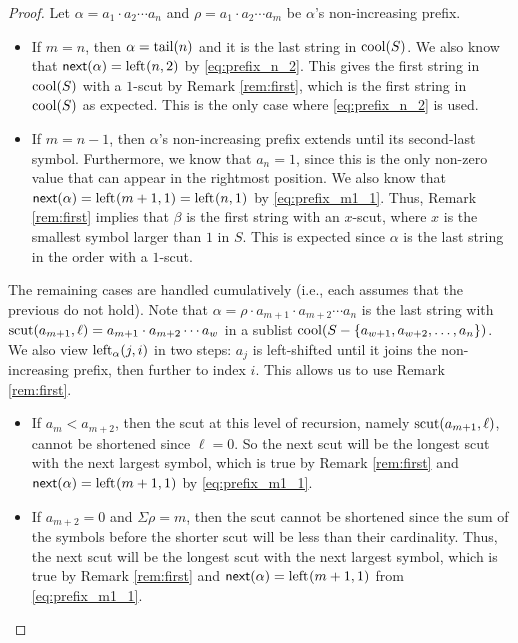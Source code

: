 \begin{proof}
Let $\alpha = a_1 \cdot a_2 \cdots a_n$ and $\rho = a_1 \cdot a_2 \cdots a_m$ be $\alpha$'s non-increasing prefix.

\begin{itemize}[nosep]
\item If $m=n$, then $\alpha = \tail(n)$ and it is the last string in $\cool{S}$.
We also know that $\nextPrefix{\alpha} = \lshiftindex{n}{2}$ by \eqref{eq:prefix_n_2}.
This gives the first string in $\cool{S}$ with a $1$-scut by Remark \ref{rem:first}, which is the first string in $\cool{S}$ as expected.
This is the only case where \eqref{eq:prefix_n_2} is used.
\item If $m=n-1$, then $\alpha$'s non-increasing prefix extends until its second-last symbol.
Furthermore, we know that $a_n = 1$, since this is the only non-zero value that can appear in the rightmost position.
We also know that $\nextPrefix{\alpha} = \lshiftindex{m+1}{1} = \lshiftindex{n}{1}$ by \eqref{eq:prefix_m1_1}.
Thus, Remark \ref{rem:first} implies that $\beta$ is the first string with an $x$-scut, where $x$ is the smallest symbol larger than $1$ in $S$.
This is expected since $\alpha$ is the last string in the order with a $1$-scut.
\end{itemize}
\noindent
The remaining cases are handled cumulatively (i.e., each assumes that the previous do not hold).
Note that $\alpha = \rho \cdot a_{m+1} \cdot a_{m+2} \cdots a_n$ is the last string with $\scut(a_{m+1}, \ell) = a_{m+1} \cdot a_{m+2} \cdots a_{w}$ in a sublist $\cool{S- \{a_{w+1}, a_{w+2}, \ldots, a_n\}}$.
We also view $\lshiftindex[\alpha]{j}{i}$ in two steps:
$a_j$ is left-shifted until it joins the non-increasing prefix, then further to index $i$.
This allows us to use Remark \ref{rem:first}. 
\begin{itemize}[nosep]
    \item If $a_m < a_{m+2}$, then the scut at this level of recursion, namely $\scut(a_{m+1}, \ell)$, cannot be shortened since $\ell=0$.
    So the next scut will be the longest scut with the next largest symbol, which is true by Remark \ref{rem:first} and $\nextPrefix{\alpha} = \lshiftindex{m+1}{1}$ by \eqref{eq:prefix_m1_1}.
    \item If $a_{m+2} = 0$ and $\Sigma \rho = m$, then the scut cannot be shortened since the sum of the symbols before the shorter scut will be less than their cardinality.
    Thus, the next scut will be the longest scut with the next largest symbol, which is true by Remark \ref{rem:first} and $\nextPrefix{\alpha} = \lshiftindex{m+1}{1}$ from  \eqref{eq:prefix_m1_1}.

\end{itemize}
\end{proof}
